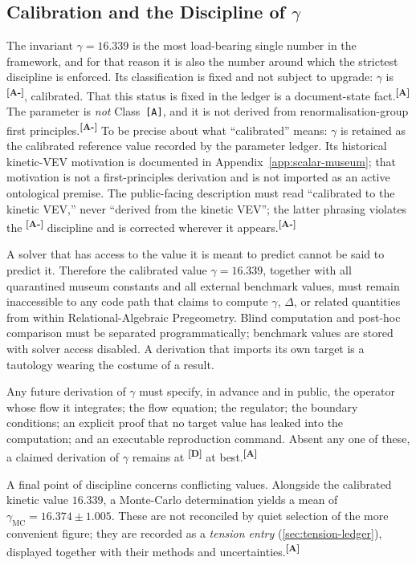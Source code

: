 \documentclass[12pt,a4paper,twoside]{article}
\theoremstyle{plain}
\theoremstyle{definition}
\theoremstyle{remark}
\newcommand{\ProjectShort}{Relational-Algebraic Pregeometry}
\newcommand{\RAP}{\ProjectShort}
\newcommand{\catmark}[1]{\textsuperscript{\textsf{\textbf{[#1]}}}}
\newcommand{\GammaGeom}{16.339} %
\newcommand{\GammaMC}{16.374 \pm 1.005} %
\begin{document}
\subsection{Calibration and the Discipline of \texorpdfstring{$\gamma$}{gamma}}
\label{subsec:gamma-discipline}

The invariant $\gamma = \GammaGeom$ is the most load-bearing single
number in the framework, and for that reason it is also the number
around which the strictest discipline is enforced. Its classification is
fixed and not subject to upgrade: $\gamma$ is \catmark{A-}, calibrated.
That this status is fixed in the ledger is a document-state fact.\catmark{A}
The parameter is \emph{not} Class~\texttt{[A]}, and it is not derived from
renormalisation-group first principles.\catmark{A-} To be precise about
what ``calibrated'' means: $\gamma$ is retained as the calibrated reference value recorded by the parameter ledger.
Its historical kinetic-VEV motivation is documented in Appendix~\ref{app:scalar-museum};
that motivation is not a first-principles derivation and is not imported as
an active ontological premise. The public-facing
description must read ``calibrated to the kinetic VEV,'' never ``derived
from the kinetic VEV''; the latter phrasing violates the \catmark{A-}
discipline and is corrected wherever it appears.\catmark{A-}

\begin{governancebox}
A solver that has access to the value it is meant to predict cannot be
said to predict it. Therefore the calibrated value $\gamma = 16.339$,
together with all quarantined museum constants and all external
benchmark values, must remain inaccessible to any code path that claims
to compute $\gamma$, $\Delta$, or related quantities from within \RAP.
Blind computation and post-hoc comparison must be separated
programmatically; benchmark values are stored with solver access
disabled. A derivation that imports its own target is a tautology
wearing the costume of a result.
\end{governancebox}

\noindent Any future derivation of $\gamma$ must specify, in advance and
in public, the operator whose flow it integrates; the flow equation; the
regulator; the boundary conditions; an explicit proof that no target
value has leaked into the computation; and an executable reproduction
command. Absent any one of these, a claimed derivation of $\gamma$
remains at \catmark{D} at best.\catmark{A}

A final point of discipline concerns conflicting values. Alongside the
calibrated kinetic value $16.339$, a Monte-Carlo determination yields a
mean of $\gamma_{\mathrm{MC}} = \GammaMC$. These are not reconciled by
quiet selection of the more convenient figure; they are recorded as a
\emph{tension entry} (\cref{sec:tension-ledger}), displayed together
with their methods and uncertainties.\catmark{A}
\end{document}
